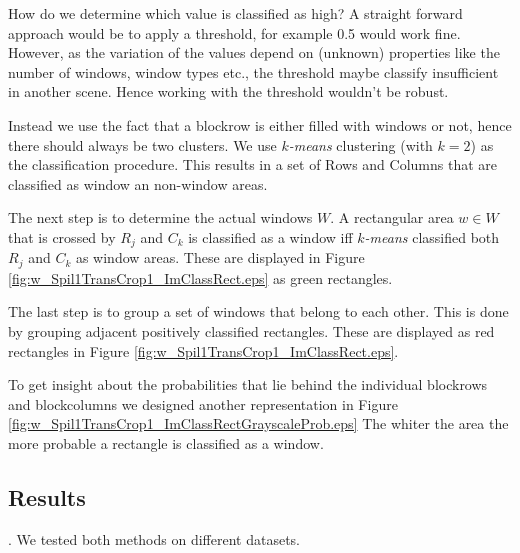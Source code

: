How do we determine which value is classified as high?  A straight forward
approach would be to apply a threshold, for example 0.5 would work fine.
However, as the variation of the values depend on (unknown) properties like the
number of windows, window types etc., the threshold maybe classify insufficient
in another scene.  Hence working with the threshold wouldn't be robust. 

Instead we use the fact that a blockrow is either filled with windows or not, hence
there should always be two clusters.  We use \emph{$k$-means} clustering (with
$k=2$) as the classification procedure.
This results in a set of Rows and Columns that are classified as window an
non-window areas.

The next step is to determine the actual windows $W$.
A rectangular area $w\in W$ that is crossed by $R_j$ and $C_k$ is classified as a
window iff \emph{$k$-means} classified both $R_j$ and $C_k$ as window areas. These are displayed in 
 Figure \ref{fig:w_Spil1TransCrop1_ImClassRect.eps} as green rectangles.

The last step is to group a set of windows that belong to each other. This is done by 
grouping adjacent positively classified rectangles. These are displayed as red
rectangles in Figure \ref{fig:w_Spil1TransCrop1_ImClassRect.eps}.


To get insight about the probabilities that lie behind the individual blockrows and blockcolumns
we designed another representation in Figure \ref{fig:w_Spil1TransCrop1_ImClassRectGrayscaleProb.eps}
The whiter the area the more probable a rectangle is classified as a window.



\subsection{Results}
\label{sec:results}.
We tested both methods on different datasets.


